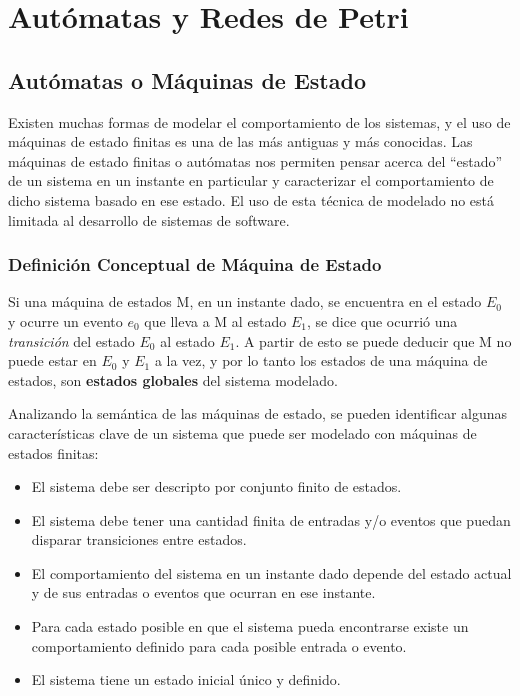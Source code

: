 \section{Autómatas y Redes de Petri}

\subsection{Autómatas o Máquinas de Estado}

Existen muchas formas de modelar el comportamiento de los sistemas, y el uso de
máquinas de estado finitas es una de las más antiguas y más conocidas.
Las máquinas de estado finitas o autómatas nos permiten pensar acerca del
``estado'' de un sistema en un instante en particular y caracterizar el comportamiento de dicho
sistema basado en ese estado. El uso de esta técnica de modelado no está
limitada al desarrollo de sistemas de software.\cite{FSM_Wright}

\subsubsection{Definición Conceptual de Máquina de Estado}

Si una máquina de estados M, en un instante dado, se encuentra en el estado
$E_{0}$ y ocurre un evento $e_{0}$ que lleva a M al estado $E_{1}$, se
dice que ocurrió una \textit{transición} del estado $E_{0}$ al estado
$E_{1}$.
A partir de esto se puede deducir que M no puede estar en $E_{0}$ y $E_{1}$
a la vez, y por lo tanto los estados de una máquina de estados, son
\textbf{estados globales} del sistema modelado.

Analizando la semántica de las máquinas de estado, se pueden
identificar algunas características clave de un sistema que puede ser modelado con máquinas de
estados finitas:
\begin{itemize}
  \item El sistema debe ser descripto por conjunto finito de estados.
  \item El sistema debe tener una cantidad finita de entradas y/o eventos que
  puedan disparar transiciones entre estados.
  \item El comportamiento del sistema en un instante dado depende del estado
  actual y de sus entradas o eventos que ocurran en ese instante.
  \item Para cada estado posible en que el sistema pueda encontrarse existe un
  comportamiento definido para cada posible entrada o evento.
  \item El sistema tiene un estado inicial único y definido.
\end{itemize} \cite{FSM_Wright}

